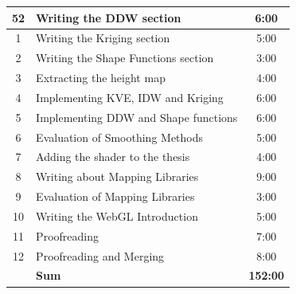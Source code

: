 \begin{table}[H]
\begin{tabularx}{\textwidth}{|c|X|c|}
        52            & Writing the DDW section                                                            & 6:00            \\
        \hline %
        1             & Writing the Kriging section                                                        & 5:00            \\
        \hline %
        2             & Writing the Shape Functions section                                                & 3:00            \\
        \hline %
        3             & Extracting the height map                                                          & 4:00            \\
        \hline %
        4             & Implementing KVE, IDW and Kriging                                                  & 6:00            \\
        \hline %
        5             & Implementing DDW and Shape functions                                               & 6:00            \\
        \hline %
        6             & Evaluation of Smoothing Methods                                                    & 5:00            \\
        \hline %
        7             & Adding the shader to the thesis                                                    & 4:00            \\
        \hline %
        8             & Writing about Mapping Libraries                                                    & 9:00            \\
        \hline %
        9             & Evaluation of Mapping Libraries                                                    & 3:00            \\
        \hline %
        10            & Writing the WebGL Introduction                                                     & 5:00            \\
        \hline %
        11            & Proofreading                                                                       & 7:00            \\
        \hline %
        12            & Proofreading and Merging                                                           & 8:00            \\
        \hline %
                      & \textbf{Sum}                                                                       & \textbf{152:00} \\
        \hline %
    \end{tabularx}
\end{table}